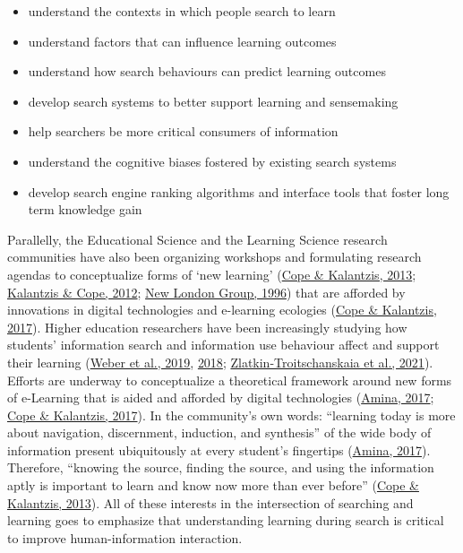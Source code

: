 \documentclass[a4paper, nobind]{templates/ociamthesis}
\begin{document}
\begin{itemize}
\item
  understand the contexts in which people search to learn
\item
  understand factors that can influence learning outcomes
\item
  understand how search behaviours can predict learning outcomes
\item
  develop search systems to better support learning and sensemaking
\item
  help searchers be more critical consumers of information
\item
  understand the cognitive biases fostered by existing search systems
\item
  develop search engine ranking algorithms and interface tools that
  foster long term knowledge gain
\end{itemize}

Parallelly, the Educational Science and the Learning Science research
communities have also been organizing workshops and formulating research
agendas to conceptualize forms of `new learning'
(\protect\hyperlink{ref-cope2013new}{Cope \& Kalantzis, 2013}; \protect\hyperlink{ref-kalantzis2012newa}{Kalantzis \& Cope, 2012}; \protect\hyperlink{ref-newlondon1996pedagogy}{New London Group, 1996}) that are
afforded by innovations in digital technologies and e-learning ecologies
(\protect\hyperlink{ref-cope2017elearningc}{Cope \& Kalantzis, 2017}). Higher education researchers have been
increasingly studying how students' information search and information
use behaviour affect and support their learning
(\protect\hyperlink{ref-weber2019informationseeking}{Weber et al., 2019}, \protect\hyperlink{ref-weber2018can}{2018}; \protect\hyperlink{ref-zlatkin2021students}{Zlatkin-Troitschanskaia et al., 2021}).
Efforts are underway to conceptualize a theoretical framework around new
forms of e-Learning that is aided and afforded by digital technologies
(\protect\hyperlink{ref-amina2017active}{Amina, 2017}; \protect\hyperlink{ref-cope2017elearningc}{Cope \& Kalantzis, 2017}). In the community's own words:
``learning today is more about navigation, discernment, induction, and
synthesis'' of the wide body of information present ubiquitously at every
student's fingertips (\protect\hyperlink{ref-amina2017active}{Amina, 2017}). Therefore, ``knowing the source,
finding the source, and using the information aptly is important to
learn and know now more than ever before'' (\protect\hyperlink{ref-cope2013new}{Cope \& Kalantzis, 2013}). All of these
interests in the intersection of searching and learning goes to
emphasize that understanding learning during search is critical to
improve human-information interaction.
\end{document}
